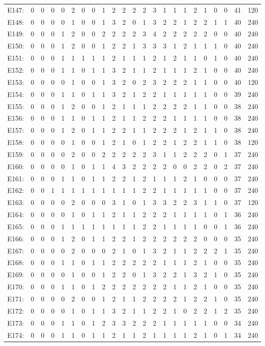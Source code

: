 \documentclass[12pt]{article}
\begin{document}
\begin{center}
\begin{tabular}{ccccccccccccccccccccc|c|c}
E147:&0&0&0&0&2&0&0&1&2&2&2&2&3&1&1&1&2&1&0&0&41&120\\
E148:&0&0&0&0&1&0&0&1&3&2&0&1&3&2&2&1&2&2&1&1&40&240\\
E149:&0&0&0&1&2&0&0&2&2&2&2&3&4&2&2&2&2&2&0&0&40&240\\
E150:&0&0&0&1&2&0&0&1&2&2&1&3&3&3&1&2&1&1&1&0&40&240\\
E151:&0&0&0&1&1&1&1&1&2&1&1&1&2&1&2&1&1&0&1&0&40&240\\
E152:&0&0&0&1&1&0&1&1&3&2&1&1&2&1&1&1&2&1&0&0&40&240\\
E153:&0&0&0&0&1&0&0&1&3&2&0&2&3&2&2&2&1&1&0&0&40&120\\
E154:&0&0&0&1&1&0&1&1&3&2&1&2&2&1&1&1&1&1&0&0&39&240\\
E155:&0&0&0&1&2&0&0&1&2&1&1&1&2&2&2&2&1&1&0&0&38&240\\
E156:&0&0&0&1&1&0&1&1&2&1&1&2&2&2&1&1&1&1&0&0&38&240\\
E157:&0&0&0&1&2&0&1&1&2&2&1&1&2&2&2&1&2&1&1&0&38&240\\
E158:&0&0&0&0&1&0&0&1&2&1&0&1&2&2&1&2&2&1&1&0&38&120\\
E159:&0&0&0&0&2&0&0&2&2&2&2&2&3&1&1&2&2&2&0&1&37&240\\
E160:&0&0&0&0&1&0&1&1&4&3&2&2&2&2&0&0&2&2&0&2&37&240\\
E161:&0&0&0&1&1&0&1&1&2&2&1&2&1&1&1&2&1&0&0&0&37&240\\
E162:&0&0&1&1&1&1&1&1&1&1&1&2&2&1&1&1&1&1&0&0&37&240\\
E163:&0&0&0&0&2&0&0&0&3&1&0&1&3&3&2&2&3&1&1&0&37&120\\
E164:&0&0&0&0&1&0&1&1&2&1&1&2&2&2&1&1&1&1&0&1&36&240\\
E165:&0&0&0&1&1&1&1&1&1&1&1&2&2&1&1&1&1&0&0&1&36&240\\
E166:&0&0&0&1&2&0&1&1&2&2&1&2&2&2&2&2&2&0&0&0&35&240\\
E167:&0&0&0&0&2&0&0&0&2&1&0&1&3&2&1&1&2&2&2&1&35&240\\
E168:&0&0&0&1&1&0&1&1&2&2&2&2&2&1&1&1&2&1&0&0&35&240\\
E169:&0&0&0&0&1&0&0&1&2&2&0&1&3&2&2&1&3&2&1&0&35&240\\
E170:&0&0&0&1&1&0&1&2&2&2&2&2&2&2&1&1&2&1&0&0&35&240\\
E171:&0&0&0&0&2&0&0&1&2&1&1&2&2&2&2&1&2&2&1&0&35&240\\
E172:&0&0&0&0&1&0&1&1&3&2&1&1&2&2&1&0&2&2&1&2&35&240\\
E173:&0&0&0&1&1&0&1&2&3&3&2&2&2&1&1&1&1&1&0&0&34&240\\
E174:&0&0&0&1&1&0&1&1&2&1&1&2&1&1&1&1&2&1&0&1&34&240\\

\end{tabular}
\end{center}
\end{document}
